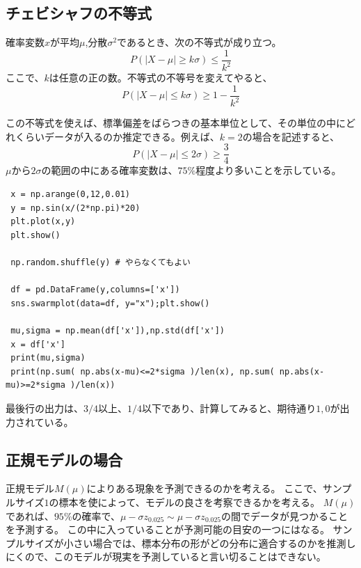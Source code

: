 \subsection{チェビシャフの不等式}
\begin{lemm}
 確率変数$x$が平均$\mu$,分散$\sigma^2$であるとき、次の不等式が成り立つ。
 \begin{equation*}
  P(|X-\mu| \geq k\sigma) \leq \frac{1}{k^2}
 \end{equation*}
ここで、$k$は任意の正の数。不等式の不等号を変えてやると、
 \begin{equation*}
  P(|X-\mu| \leq k\sigma) \geq 1-\frac{1}{k^2}
 \end{equation*}
\end{lemm}
この不等式を使えば、標準偏差をばらつきの基本単位として、その単位の中にどれくらいデータが入るのか推定できる。例えば、$k=2$の場合を記述すると、
 \begin{equation*}
  P(|X-\mu| \leq 2\sigma) \geq \frac{3}{4}
 \end{equation*}
$\mu$から$2\sigma$の範囲の中にある確率変数は、$75\%$程度より多いことを示している。
\begin{lstlisting}
 x = np.arange(0,12,0.01)
 y = np.sin(x/(2*np.pi)*20)
 plt.plot(x,y)
 plt.show()

 np.random.shuffle(y) # やらなくてもよい

 df = pd.DataFrame(y,columns=['x'])
 sns.swarmplot(data=df, y="x");plt.show()

 mu,sigma = np.mean(df['x']),np.std(df['x'])
 x = df['x']
 print(mu,sigma)
 print(np.sum( np.abs(x-mu)<=2*sigma )/len(x), np.sum( np.abs(x-mu)>=2*sigma )/len(x))
\end{lstlisting}
最後行の出力は、$3/4$以上、$1/4$以下であり、計算してみると、期待通り$1,0$が出力されている。




\subsection{正規モデルの場合}
正規モデル$M(\mu)$によりある現象を予測できるのかを考える。
ここで、サンプルサイズ$1$の標本を使によって、モデルの良さを考察できるかを考える。
$M(\mu)$であれば、$95\%$の確率で、$\mu-\sigma z_{0.025}\sim \mu-\sigma z_{0.025}$の間でデータが見つかることを予測する。
この中に入っていることが予測可能の目安の一つにはなる。
サンプルサイズが小さい場合では、標本分布の形がどの分布に適合するのかを推測しにくので、このモデルが現実を予測していると言い切ることはできない。

